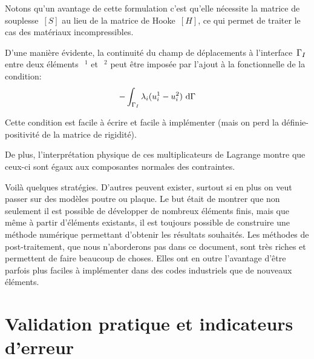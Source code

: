 \begin{description}
	Notons qu'un avantage de cette formulation c'est qu'elle nécessite la matrice de souplesse~$[S]$ au lieu de la matrice de Hooke~$[H]$, ce qui permet de traiter le cas des matériaux incompressibles. 
	
	\item[\textcolorblue{Multiplicateurs de Lagrange:}]
	
	D'une manière évidente, la continuité du champ de déplacements 	à l'interface~$\Gamma_I$ entre deux éléments~$~^1$ et~$~^2$ peut être imposée par l'ajout à la fonctionnelle de la condition: 
	\begin{equation} -\dint_{\li} \lambda_i(u_i^1-u_i^2)\ \dd\Gamma \end{equation}

	Cette condition est facile à écrire et facile à implémenter (mais on perd la 	définie-positivité de la matrice de rigidité).
	
	De plus, l'interprétation physique de ces multiplicateurs de Lagrange montre 	que ceux-ci sont égaux aux composantes normales des contraintes.
\end{description}
\medskip
Voilà quelques stratégies. D'autres peuvent exister, surtout si en plus on veut passer sur des modèles poutre ou plaque.
Le but était de montrer que non seulement il est possible de développer de nombreux éléments finis, mais que même à partir d'éléments existants, il est toujours possible de construire une méthode numérique permettant d'obtenir les résultats souhaités.
Les méthodes de post-traitement, que nous n'aborderons pas dans ce document, sont très riches et permettent de faire beaucoup de choses. Elles ont en outre l'avantage d'être parfois plus faciles à implémenter dans des codes industriels que de nouveaux éléments.

\medskip
\section{Validation pratique et indicateurs d'erreur}\label{Sec-ValidEF}

